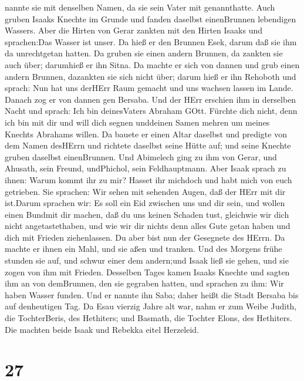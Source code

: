 nannte sie mit denselben Namen, da sie sein Vater mit genannthatte.
 Auch gruben Isaaks Knechte im Grunde und fanden daselbst
einenBrunnen lebendigen Wassers.  Aber die Hirten von Gerar
zankten mit den Hirten Isaaks und sprachen:Das Wasser ist unser. Da hieß
er den Brunnen Esek, darum daß sie ihm da unrechtgetan hatten.
 Da gruben sie einen andern Brunnen, da zankten sie auch
über; darumhieß er ihn Sitna.  Da machte er sich von dannen
und grub einen andern Brunnen, dazankten sie sich nicht über; darum hieß
er ihn Rehoboth und sprach: Nun hat uns derHErr Raum gemacht und uns
wachsen lassen im Lande.  Danach zog er von dannen gen
Bersaba.  Und der HErr erschien ihm in derselben Nacht und
sprach: Ich bin deinesVaters Abraham GOtt. Fürchte dich nicht, denn ich
bin mit dir und will dich segnen unddeinen Samen mehren um meines
Knechts Abrahams willen.  Da bauete er einen Altar daselbst
und predigte von dem Namen desHErrn und richtete daselbst seine Hütte
auf; und seine Knechte gruben daselbst einenBrunnen.  Und
Abimelech ging zu ihm von Gerar, und Ahusath, sein Freund, undPhichol,
sein Feldhauptmann.  Aber Isaak sprach zu ihnen: Warum
kommt ihr zu mir? Hasset ihr michdoch und habt mich von euch getrieben.
 Sie sprachen: Wir sehen mit sehenden Augen, daß der HErr
mit dir ist.Darum sprachen wir: Es soll ein Eid zwischen uns und dir
sein, und wollen einen Bundmit dir machen,  daß du uns
keinen Schaden tust, gleichwie wir dich nicht angetastethaben, und wie
wir dir nichts denn alles Gute getan haben und dich mit Frieden
ziehenlassen. Du aber bist nun der Gesegnete des HErrn.  Da
machte er ihnen ein Mahl, und sie aßen und tranken.  Und
des Morgens frühe stunden sie auf, und schwur einer dem andern;und Isaak
ließ sie gehen, und sie zogen von ihm mit Frieden. 
Desselben Tages kamen Isaaks Knechte und sagten ihm an von demBrunnen,
den sie gegraben hatten, und sprachen zu ihm: Wir haben Wasser funden.
 Und er nannte ihn Saba; daher heißt die Stadt Bersaba bis
auf denheutigen Tag.  Da Esau vierzig Jahre alt war, nahm
er zum Weibe Judith, die TochterBeris, des Hethiters; und Basmath, die
Tochter Elons, des Hethiters.  Die machten beide Isaak und
Rebekka eitel Herzeleid.

\hypertarget{section-26}{%
\section{27}\label{section-26}}

